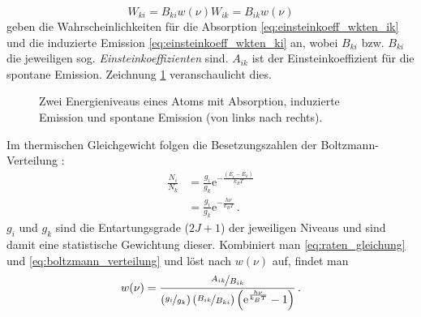 \begin{subequations}\label{eq:einsteinkoeff_wkten}
	\begin{equation}\label{eq:einsteinkoeff_wkten_ik}
		W_{ki}=B_{ki}w(\nu)
	\end{equation}
	\begin{equation}\label{eq:einsteinkoeff_wkten_ki}
		W_{ik}=B_{ik}w(\nu)
	\end{equation}	
\end{subequations}
geben die Wahrscheinlichkeiten für die Absorption
\eqref{eq:einsteinkoeff_wkten_ik} und die induzierte Emission
\eqref{eq:einsteinkoeff_wkten_ki} an, wobei $B_{ki}$ bzw. $B_{ki}$ die
jeweiligen sog.
\textit{Einsteinkoeffizienten} sind. $A_{ik}$ ist der Einsteinkoeffizient für
die spontane Emission. Zeichnung \ref{fig:einstein_koeffizienten}
veranschaulicht dies.
\begin{figure}[h]
	\centering
	\caption[Einsteinkoeffizienten]{Zwei Energieniveaus eines Atoms mit Absorption,
	induzierte Emission und spontane Emission (von links nach rechts).}
	\label{fig:einstein_koeffizienten}
\end{figure}
Im thermischen Gleichgewicht folgen die Besetzungszahlen der
Boltzmann-Verteilung \cite{demtroeder:ex3}:
\begin{equation}\label{eq:boltzmann_verteilung}
	\begin{split}
		\frac{N_i}{N_k}&=\frac{g_i}{g_k}\mathrm{e}^{-\frac{(E_i-E_k)}{k_BT}}\\[0.2cm]
		&=\frac{g_i}{g_k}\mathrm{e}^{-\frac{h\nu}{k_BT}}\,.
	\end{split}	
\end{equation}
$g_i$ und $g_k$ sind die Entartungsgrade ($2J+1$) der jeweiligen Niveaus und
sind damit eine statistische Gewichtung dieser.
Kombiniert man \eqref{eq:raten_gleichung} und \eqref{eq:boltzmann_verteilung}
und löst nach $w(\nu)$ auf, findet man
\begin{equation}\label{eq:spektrale_energiedichte_1}
	w(\nu)=\frac{\nicefrac{A_{ik}}{B_{ik}}}{\left(\nicefrac{g_i}{g_k}\right)\left(\nicefrac{B_{ik}}{B_{ki}}\right)\left(\mathrm{e}^\frac{h\nu}{k_BT}-1\right)}\,.
\end{equation}
